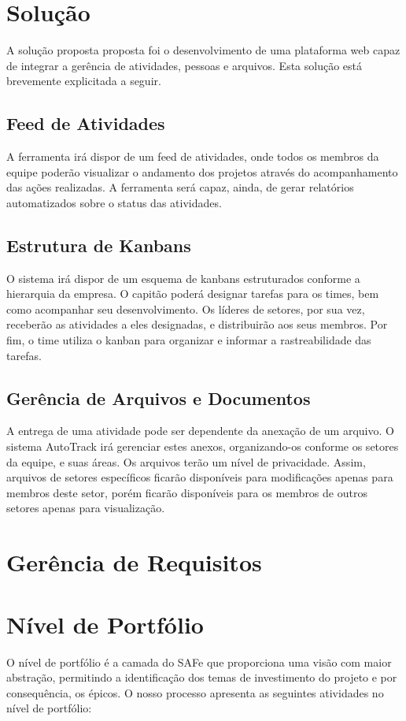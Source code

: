\section{Solução}
A solução proposta proposta foi o desenvolvimento de uma plataforma web capaz de integrar a gerência de atividades,
pessoas e arquivos. Esta solução está brevemente explicitada a seguir.

\subsection{Feed de Atividades}
A ferramenta irá dispor de um feed de atividades, onde todos os membros da equipe poderão visualizar o andamento
 dos projetos através do acompanhamento das ações realizadas. A ferramenta será capaz, ainda, de gerar
  relatórios automatizados sobre o status das atividades.

\subsection{Estrutura de Kanbans}
O sistema irá dispor de um esquema de kanbans estruturados conforme a hierarquia da empresa. O capitão poderá designar tarefas para os times,
bem como acompanhar seu desenvolvimento. Os líderes de setores, por sua vez, receberão as atividades a eles designadas,
 e distribuirão aos seus membros. Por fim, o time utiliza o kanban para organizar e informar a rastreabilidade das tarefas.

\subsection{Gerência de Arquivos e Documentos}
A entrega de uma atividade pode ser dependente da anexação de um arquivo. O sistema AutoTrack irá
gerenciar estes anexos, organizando-os conforme os setores da equipe, e suas áreas. Os arquivos terão um nível de privacidade.
 Assim, arquivos de setores específicos ficarão disponíveis para modificações apenas para membros deste setor, porém
  ficarão disponíveis para os membros de outros setores apenas para visualização.

\section{Gerência de Requisitos}
\section{Nível de Portfólio}
O nível de portfólio é a camada do SAFe que proporciona uma visão com maior abstração, permitindo a identificação dos temas de investimento
do projeto e por consequência, os épicos. O nosso processo apresenta as seguintes atividades no nível de portfólio:

